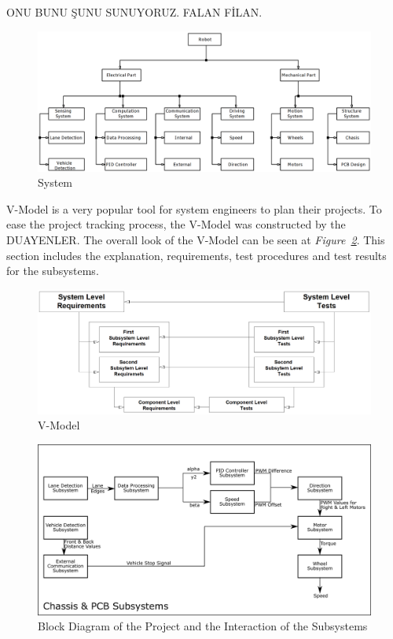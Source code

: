 \documentclass[a4paper,12pt]{article}
\begin{document}
 ONU BUNU ŞUNU SUNUYORUZ. FALAN FİLAN.
			

	

	\begin{figure}[h]
		\includegraphics[width=\textwidth,center]{images/system}
		\caption{System}\label{fig:system}
	\end{figure}
	
	
	
	
	V-Model is a very popular tool for system engineers to plan their projects. To ease the project tracking process, the V-Model was constructed by the DUAYENLER. The overall look of the V-Model can be seen at \textit{Figure~\ref{fig:vmodel}}. This section includes the explanation, requirements, test procedures and test results for the subsystems.
	
	\begin{figure}[h]
		\includegraphics[width=\textwidth,center]{images/vModels/vmodel}
		\caption{V-Model}\label{fig:vmodel}
	\end{figure}
			
			
	\begin{figure}[h]
		\includegraphics[width=\textwidth,center]{images/subsys_block}
		\caption{Block Diagram of the Project and the Interaction of the Subsystems}\label{fig:subsys-block}
	\end{figure}
		
\end{document}
